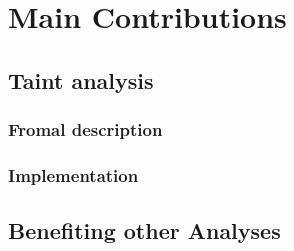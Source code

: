 
\chapter{Main Contributions}\label{chapter:mainContributions}

  \section{Taint analysis}
    
    \subsection{Fromal description}

    \subsection{Implementation}

  \section{Benefiting other Analyses}


